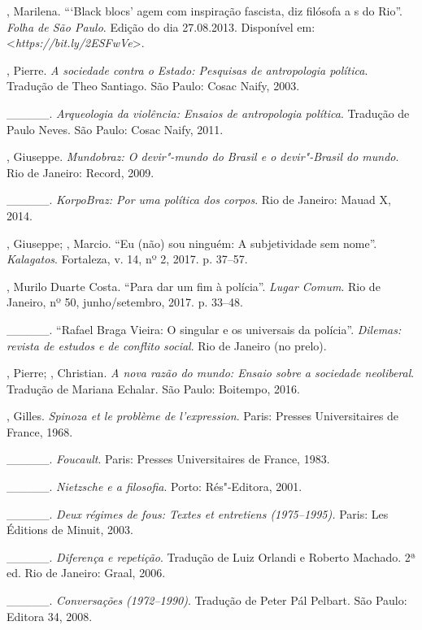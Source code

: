 \begin{Parskip}
, Marilena. ```Black blocs' agem com inspiração fascista, diz
filósofa a s do Rio''. \emph{Folha de São Paulo}. Edição do dia
27.08.2013. Disponível em:
\textless{}\emph{https://bit.ly/2ESFwVe}\textgreater{}.

, Pierre. \emph{A sociedade contra o Estado: Pesquisas
de antropologia política}. Tradução de Theo Santiago. São Paulo: Cosac
Naify, 2003.

\_\_\_\_\_. \emph{Arqueologia da violência: Ensaios de
antropologia política}. Tradução de Paulo Neves. São Paulo: Cosac Naify, 2011.

, Giuseppe. \emph{Mundobraz: O devir"-mundo do Brasil e o
devir"-Brasil do mundo}. Rio de Janeiro: Record, 2009.

\_\_\_\_\_. \emph{KorpoBraz: Por uma política dos corpos}. Rio de
Janeiro: Mauad X, 2014.

, Giuseppe; , Marcio. ``Eu (não) sou ninguém: A
subjetividade sem nome''. \emph{Kalagatos}. Fortaleza, v. 14, nº 2, 2017. p.
37--57.

, Murilo Duarte Costa. ``Para dar um fim à polícia''.
\emph{Lugar Comum}. Rio de Janeiro, nº 50, junho/setembro, 2017. p. 33--48.

\_\_\_\_\_. ``Rafael Braga Vieira: O singular e os universais da
polícia''. \emph{Dilemas: revista de estudos e de conflito social}. Rio de
Janeiro (no prelo).

, Pierre; , Christian. \emph{A nova razão do mundo:
Ensaio sobre a sociedade neoliberal}. Tradução de Mariana Echalar. São
Paulo: Boitempo, 2016.

, Gilles. \emph{Spinoza et le problème de l'expression}.
Paris: Presses Universitaires de France, 1968.

\_\_\_\_\_. \emph{Foucault}. Paris: Presses Universitaires de
France, 1983.

\_\_\_\_\_. \emph{Nietzsche e a filosofia}. Porto: Rés"-Editora, 2001.

\_\_\_\_\_. \emph{Deux régimes de fous: Textes et entretiens
(1975--1995).} Paris: Les Éditions de Minuit, 2003.

\_\_\_\_\_. \emph{Diferença e repetição}. Tradução de Luiz
Orlandi e Roberto Machado. 2ª ed. Rio de Janeiro: Graal, 2006.

\_\_\_\_\_. \emph{Conversações (1972--1990)}. Tradução de Peter Pál
Pelbart. São Paulo: Editora 34, 2008.


\end{Parskip}
